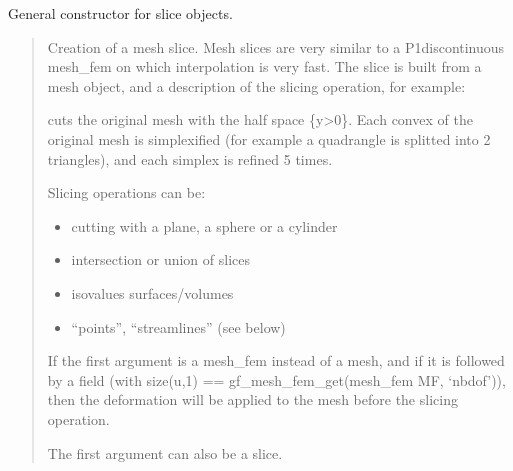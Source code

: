 \documentclass[a4paper,11pt,english]{sphinxmanual}
\begin{document}
\sphinxAtStartPar
General constructor for slice objects.
\begin{quote}

\sphinxAtStartPar
Creation of a mesh slice. Mesh slices are very similar to a
P1\sphinxhyphen{}discontinuous mesh\_fem on which interpolation is very fast. The slice is
built from a mesh object, and a description of the slicing operation, for
example:

\begin{sphinxVerbatim}[commandchars=\\\{\}]
  \PYG{p}{[}\PYG{p}{]}\PYG{p}{[}\PYG{p}{]}  
\end{sphinxVerbatim}

\sphinxAtStartPar
cuts the original mesh with the half space \{y\textgreater{}0\}. Each convex of the
original mesh  is simplexified (for example a quadrangle is splitted
into 2 triangles), and each simplex is refined 5 times.

\sphinxAtStartPar
Slicing operations can be:
\begin{itemize}
\item {} 
\sphinxAtStartPar
cutting with a plane, a sphere or a cylinder

\item {} 
\sphinxAtStartPar
intersection or union of slices

\item {} 
\sphinxAtStartPar
isovalues surfaces/volumes

\item {} 
\sphinxAtStartPar
“points”, “streamlines” (see below)

\end{itemize}

\sphinxAtStartPar
If the first argument is a mesh\_fem  instead of a mesh, and if it is
followed by a \sphinxhyphen{}field  (with size(u,1) ==
gf\_mesh\_fem\_get(mesh\_fem MF, ‘nbdof’)), then the deformation  will be applied to the
mesh before the slicing operation.

\sphinxAtStartPar
The first argument can also be a slice.
\end{quote}
\end{document}
